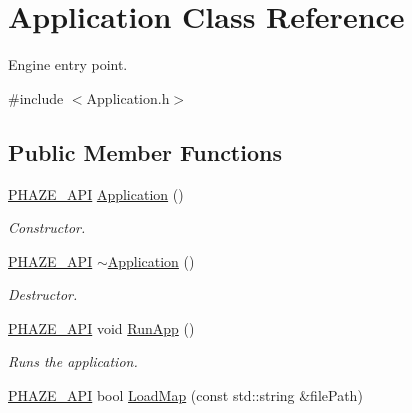 \hypertarget{class_application}{}\section{Application Class Reference}
\label{class_application}


Engine entry point.  




{\ttfamily \#include $<$Application.\+h$>$}

\subsection*{Public Member Functions}
\begin{DoxyCompactItemize}
\item 
\mbox{\label{class_application_afa8cc05ce6b6092be5ecdfdae44e05f8}} 
\mbox{\hyperlink{_macros_8h_a9ce0e6835f82908079752fa4ebe70dc9}{P\+H\+A\+Z\+E\+\_\+\+A\+PI}} \mbox{\hyperlink{class_application_afa8cc05ce6b6092be5ecdfdae44e05f8}{Application}} ()
\begin{DoxyCompactList}\small\item\em Constructor. \end{DoxyCompactList}\item 
\mbox{\label{class_application_a748bca84fefb9c12661cfaa2f623748d}} 
\mbox{\hyperlink{_macros_8h_a9ce0e6835f82908079752fa4ebe70dc9}{P\+H\+A\+Z\+E\+\_\+\+A\+PI}} \mbox{\hyperlink{class_application_a748bca84fefb9c12661cfaa2f623748d}{$\sim$\+Application}} ()
\begin{DoxyCompactList}\small\item\em Destructor. \end{DoxyCompactList}\item 
\mbox{\label{class_application_a82c81028a029a840f92c37a977c527b8}} 
\mbox{\hyperlink{_macros_8h_a9ce0e6835f82908079752fa4ebe70dc9}{P\+H\+A\+Z\+E\+\_\+\+A\+PI}} void \mbox{\hyperlink{class_application_a82c81028a029a840f92c37a977c527b8}{Run\+App}} ()
\begin{DoxyCompactList}\small\item\em Runs the application. \end{DoxyCompactList}\item 
\mbox{\hyperlink{_macros_8h_a9ce0e6835f82908079752fa4ebe70dc9}{P\+H\+A\+Z\+E\+\_\+\+A\+PI}} bool \mbox{\hyperlink{class_application_a5cce771d4da11e5ebbf573206775cd41}{Load\+Map}} (const std\+::string \&file\+Path)

\end{DoxyCompactItemize}
